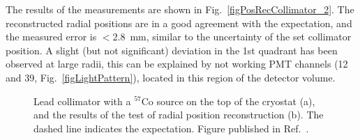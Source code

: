 The results of the measurements are shown in Fig.~\ref{figPosRecCollimator_2}. The reconstructed radial positions are in a good agreement with the expectation, and the measured error is $<$2.8~mm, similar to the uncertainty of the set collimator position. A slight (but not significant) deviation in the 1st quadrant has been observed at large radii, this can be explained by not working PMT channels (12 and 39, Fig.~\ref{figLightPattern}), located in this region of the detector volume.

\begin{figure}[!h]
\centering
{}
\caption[Lead collimator with a $^{57}$Co source on the top of the cryostat, and the results of the test of radial position reconstruction]{Lead collimator with a $^{57}$Co source on the top of the cryostat (a), and the results of the test of radial position reconstruction (b). The dashed line indicates the expectation. Figure published in  Ref.~\cite{xe100-instrument}.}
\label{figPosRecCollimator}
\end{figure}



